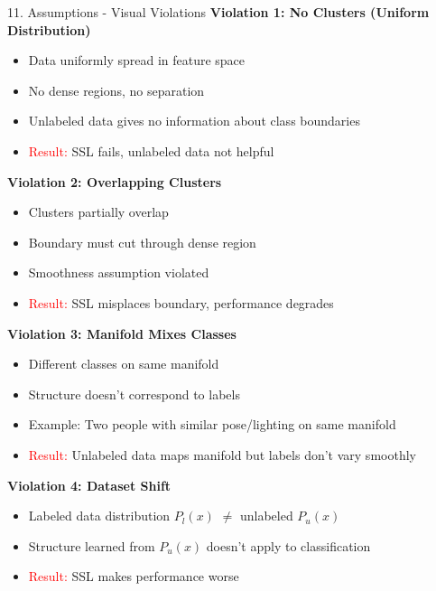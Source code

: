 \documentclass[8pt]{beamer}
\begin{document}
	\begin{frame}{11. Assumptions - Visual Violations}
		\fontsize{6.5}{7.5}\selectfont
		\textbf{Violation 1: No Clusters (Uniform Distribution)}
		\begin{itemize}
			\item Data uniformly spread in feature space
			\item No dense regions, no separation
			\item Unlabeled data gives no information about class boundaries
			\item \textcolor{red}{Result:} SSL fails, unlabeled data not helpful
		\end{itemize}
		
		\textbf{Violation 2: Overlapping Clusters}
		\begin{itemize}
			\item Clusters partially overlap
			\item Boundary must cut through dense region
			\item Smoothness assumption violated
			\item \textcolor{red}{Result:} SSL misplaces boundary, performance degrades
		\end{itemize}
		
		\textbf{Violation 3: Manifold Mixes Classes}
		\begin{itemize}
			\item Different classes on same manifold
			\item Structure doesn't correspond to labels
			\item Example: Two people with similar pose/lighting on same manifold
			\item \textcolor{red}{Result:} Unlabeled data maps manifold but labels don't vary smoothly
		\end{itemize}
		
		\textbf{Violation 4: Dataset Shift}
		\begin{itemize}
			\item Labeled data distribution $P_l(x)$ $\neq$ unlabeled $P_u(x)$
			\item Structure learned from $P_u(x)$ doesn't apply to classification
			\item \textcolor{red}{Result:} SSL makes performance worse
		\end{itemize}
	\end{frame}
	
\end{document}
